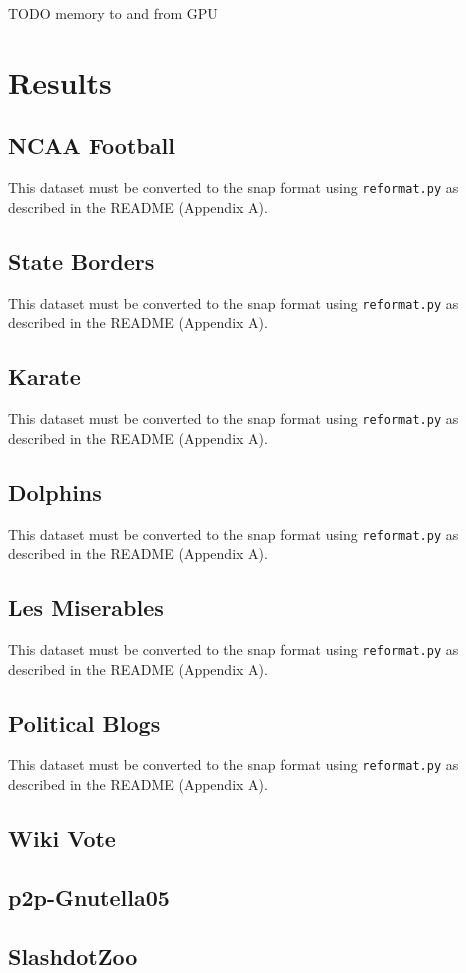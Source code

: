 \documentclass[draft]{report}
\begin{document}
TODO memory to and from GPU

\section{Results}
\subsection{NCAA Football}
This dataset must be converted to the snap format using \texttt{reformat.py} as described in the README (Appendix A).
\subsection{State Borders}
This dataset must be converted to the snap format using \texttt{reformat.py} as described in the README (Appendix A).
\subsection{Karate}
This dataset must be converted to the snap format using \texttt{reformat.py} as described in the README (Appendix A).
\subsection{Dolphins}
This dataset must be converted to the snap format using \texttt{reformat.py} as described in the README (Appendix A).
\subsection{Les Miserables}
This dataset must be converted to the snap format using \texttt{reformat.py} as described in the README (Appendix A).
\subsection{Political Blogs}
This dataset must be converted to the snap format using \texttt{reformat.py} as described in the README (Appendix A).
\subsection{Wiki Vote}
\subsection{p2p-Gnutella05}
\subsection{SlashdotZoo}
\end{document}
